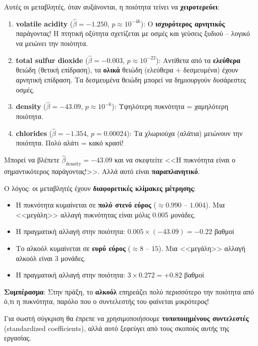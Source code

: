 \documentclass[12pt,a4paper]{article}
\begin{document}
Αυτές οι μεταβλητές, όταν αυξάνονται, η ποιότητα τείνει να \textbf{χειροτερεύει}:

\begin{enumerate}
    \item \textbf{volatile acidity} ($\hat{\beta} = -1.250$, $p \approx 10^{-46}$): Ο \textbf{ισχυρότερος αρνητικός} παράγοντας! Η πτητική οξύτητα σχετίζεται με οσμές και γεύσεις ξυδιού -- λογικό να μειώνει την ποιότητα.

    \item \textbf{total sulfur dioxide} ($\hat{\beta} = -0.003$, $p \approx 10^{-22}$): Αντίθετα από τα \textbf{ελεύθερα} θειώδη (θετική επίδραση), τα \textbf{ολικά} θειώδη (ελεύθερα + δεσμευμένα) έχουν αρνητική επίδραση. Τα δεσμευμένα θειώδη μπορεί να δημιουργούν δυσάρεστες οσμές.

    \item \textbf{density} ($\hat{\beta} = -43.09$, $p \approx 10^{-6}$): Υψηλότερη πυκνότητα = χαμηλότερη ποιότητα.

    \item \textbf{chlorides} ($\hat{\beta} = -1.354$, $p = 0.00024$): Τα χλωριούχα (αλάτια) μειώνουν την ποιότητα. Πολύ αλάτι = κακό κρασί!
\end{enumerate}

\begin{warningbox}
Μπορεί να βλέπετε $\hat{\beta}_{\text{density}} = -43.09$ και να σκεφτείτε <<Η πυκνότητα είναι ο σημαντικότερος παράγοντας!>>. Αλλά αυτό είναι \textbf{παραπλανητικό}.

Ο λόγος: οι μεταβλητές έχουν \textbf{διαφορετικές κλίμακες μέτρησης}:
\begin{itemize}
    \item Η πυκνότητα κυμαίνεται σε \textbf{πολύ στενό εύρος} ($\approx 0.990$ -- $1.004$). Μια <<μεγάλη>> αλλαγή πυκνότητας είναι μόλις 0.005 μονάδες.
    \item Η πραγματική αλλαγή στην ποιότητα: $0.005 \times (-43.09) = -0.22$ βαθμοί
    \item Το αλκοόλ κυμαίνεται σε \textbf{ευρύ εύρος} ($\approx 8$ -- $15$). Μια <<μεγάλη>> αλλαγή αλκοόλ είναι 3 μονάδες.
    \item Η πραγματική αλλαγή στην ποιότητα: $3 \times 0.272 = +0.82$ βαθμοί
\end{itemize}

\textbf{Συμπέρασμα}: Στην πράξη, το \textbf{αλκοόλ} επηρεάζει πολύ περισσότερο την ποιότητα από ό,τι η πυκνότητα, παρόλο που ο συντελεστής του φαίνεται μικρότερος!

Για σωστή σύγκριση θα έπρεπε να χρησιμοποιήσουμε \textbf{τυποποιημένους συντελεστές} (standardized coefficients), αλλά αυτό ξεφεύγει από τους σκοπούς αυτής της εργασίας.
\end{warningbox}
\end{document}
